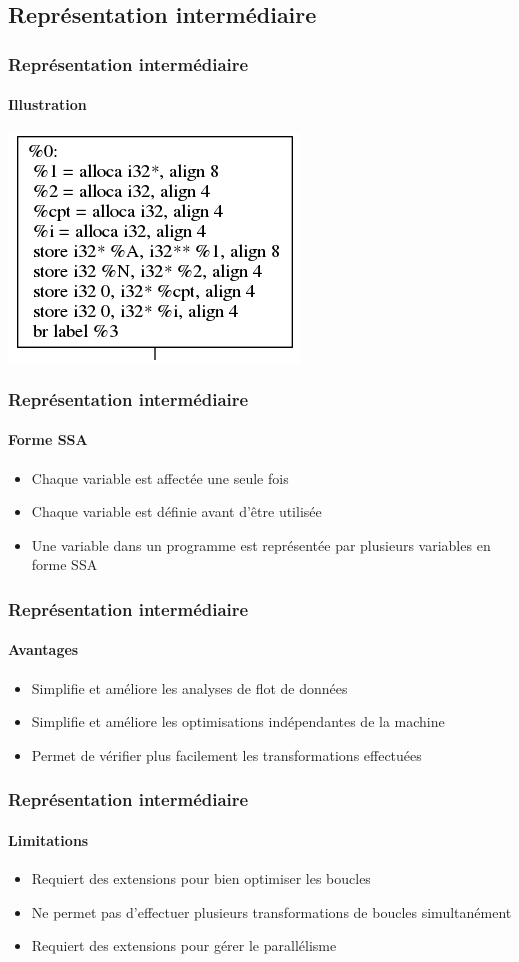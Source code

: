 \documentclass{beamer}
\begin{document}
\subsection{Représentation intermédiaire}
\begin{frame}
\frametitle{Représentation intermédiaire}
\framesubtitle{Illustration}
\begin{center}
\colorbox{white}{\includegraphics[scale=0.7]{basic block.png}}
\end{center}
\end{frame}

\begin{frame}
\frametitle{Représentation intermédiaire}
\framesubtitle{Forme SSA}
\begin{itemize}
\item Chaque variable est affectée une seule fois
\item Chaque variable est définie avant d'être utilisée
\item Une variable dans un programme est représentée par plusieurs variables en forme SSA
\end{itemize}
\end{frame}

\begin{frame}
\frametitle{Représentation intermédiaire}
\framesubtitle{Avantages}
\begin{itemize}
\item Simplifie et améliore les analyses de flot de données
\item Simplifie et améliore les optimisations indépendantes de la machine
\item Permet de vérifier plus facilement les transformations effectuées
\end{itemize}
\end{frame}

\begin{frame}
\frametitle{Représentation intermédiaire}
\framesubtitle{Limitations}
\begin{itemize}
\item Requiert des extensions pour bien optimiser les boucles
\item Ne permet pas d'effectuer plusieurs transformations de boucles simultanément
\item Requiert des extensions pour gérer le parallélisme
\end{itemize}
\end{frame}
\end{document}
